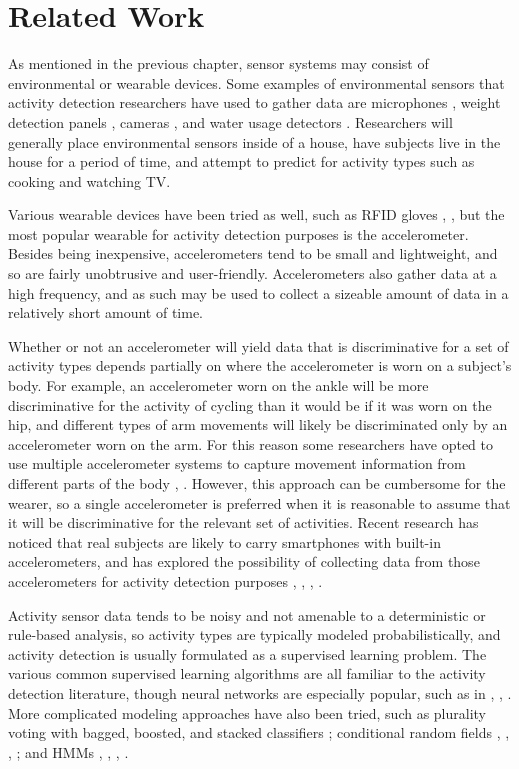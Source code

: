 \chapter{Related Work}
As mentioned in the previous chapter, sensor systems may consist
of environmental or wearable devices. Some examples of environmental
sensors that activity detection researchers have used to
gather data are microphones \cite{fogarty06}, weight detection
panels \cite{rowan05}, cameras \cite{duong05}, and water usage detectors
\cite{fogarty06}. Researchers will generally place environmental sensors
inside of a house, have subjects live in the house for a period of time, and
attempt to predict for activity types such as cooking and watching TV.

Various wearable devices have been tried as well, such as RFID gloves
\cite{gu09}, \cite{rowan05}, but the most popular wearable for activity detection
purposes is the accelerometer. Besides being inexpensive, accelerometers
tend to be small and lightweight, and so are fairly unobtrusive and
user-friendly. Accelerometers also gather data at a high frequency, and as such
may be used to collect a sizeable amount of data in a relatively short amount
of time.

Whether or not an accelerometer will yield data that is discriminative for a
set of activity types depends partially on where the accelerometer is worn on
a subject's body. For example, an accelerometer worn on the ankle will be
more discriminative for the activity of cycling than it would be if it was worn
on the hip, and different types of arm movements will likely be
discriminated only by an accelerometer worn on the arm. For this reason some
researchers have opted to use multiple accelerometer systems to capture
movement information from different parts of the body \cite{bao04},
\cite{devries11}. However, this approach can be cumbersome for the wearer, so a
single accelerometer is preferred when it is reasonable to assume that it will
be discriminative for the relevant set of activities. Recent research has
noticed that real subjects are likely to carry smartphones with built-in
accelerometers, and has explored the possibility of collecting data from those
accelerometers for activity detection purposes \cite{bao04}, \cite{choudhury08},
\cite{kwapitz10}, \cite{rai12}.

Activity sensor data tends to be noisy and not amenable to a
deterministic or rule-based analysis, so activity types are typically modeled
probabilistically, and activity detection is usually formulated as a supervised
learning problem. The various common supervised learning algorithms are all
familiar to the activity detection literature, though neural networks are
especially popular, such as in \cite{aminian95}, \cite{song07}, \cite{staudenmeyer09}.
More complicated modeling approaches have also been tried, such as
plurality voting with bagged, boosted, and stacked classifiers \cite{ravi05};
conditional random fields \cite{blanke10}, \cite{gu09}, \cite{vankasteren08},
\cite{wu09}; and HMMs \cite{gu09}, \cite{lester05}, \cite{pober06}, \cite{wu09}.

